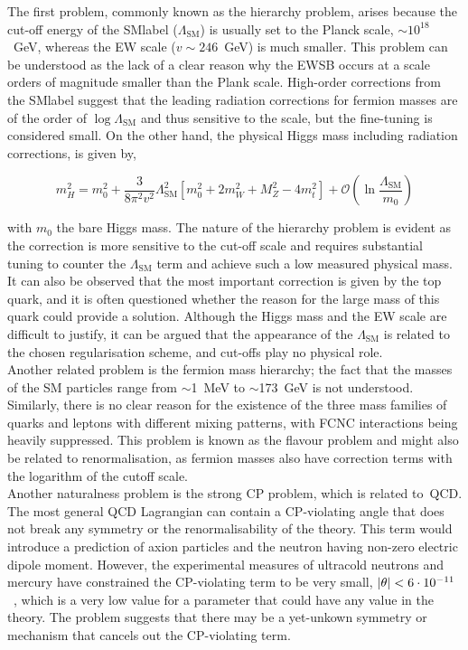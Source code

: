 The first problem, commonly known as the hierarchy problem, arises because the cut-off energy of the \acrshort{SMlabel} ($\Lambda_{\text{SM}}$) is usually set to the Planck scale, $\sim10^{18}$~GeV, whereas the \acrshort{EW} scale ($v\sim246$~GeV) is much smaller. This problem can be understood as the lack of a clear reason why the \acrshort{EWSB} occurs at a scale orders of magnitude smaller than the Plank scale. High-order corrections from the \acrshort{SMlabel} suggest that the leading radiation corrections for fermion masses are of the order of $\log\Lambda_{\text{SM}}$ and thus sensitive to the scale, but the fine-tuning is considered small. On the other hand, the physical Higgs mass including radiation corrections, is given by,

\begin{equation}
    m^2_H = m_0^2 + \frac{3}{8\pi^2v^2}\Lambda_{\text{SM}}^2 [ m_0^2 + 2m_W^2 + M_Z^2 - 4m_t^2] + \mathcal{O}(\ln\frac{\Lambda_{\text{SM}}}{m_0})
\end{equation}

with $m_0$ the bare Higgs mass. The nature of the hierarchy problem is evident as the correction is more sensitive to the cut-off scale and requires substantial tuning to counter the $\Lambda_{\text{SM}}$ term and achieve such a low measured physical mass. It can also be observed that the most important correction is given by the top quark, and it is often questioned whether the reason for the large mass of this quark could provide a solution. Although the Higgs mass and the \acrshort{EW} scale are difficult to justify, it can be argued that the appearance of the $\Lambda_{\text{SM}}$ is related to the chosen regularisation scheme, and cut-offs play no physical role.\\

Another related problem is the fermion mass hierarchy; the fact that the masses of the SM particles range from $\sim$1~MeV to $\sim$173~GeV is not understood. Similarly, there is no clear reason for the existence of the three mass families of quarks and leptons with different mixing patterns, with FCNC interactions being heavily suppressed. This problem is known as the flavour problem and might also be related to renormalisation, as fermion masses also have correction terms with the logarithm of the cutoff scale.\\

Another naturalness problem is the strong CP problem, which is related to~\acrshort{QCD}. The most general QCD Lagrangian can contain a CP-violating angle that does not break any symmetry or the renormalisability of the theory. This term would introduce a prediction of axion particles and the neutron having non-zero electric dipole moment. However, the experimental measures of ultracold neutrons and mercury have constrained the CP-violating term to be very small, $\abs{\theta}<6\cdot10^{-11}$~\cite{PhysRevLett.124.081803}, which is a very low value for a parameter that could have any value in the theory. The problem suggests that there may be a yet-unkown symmetry or mechanism that cancels out the CP-violating term.
